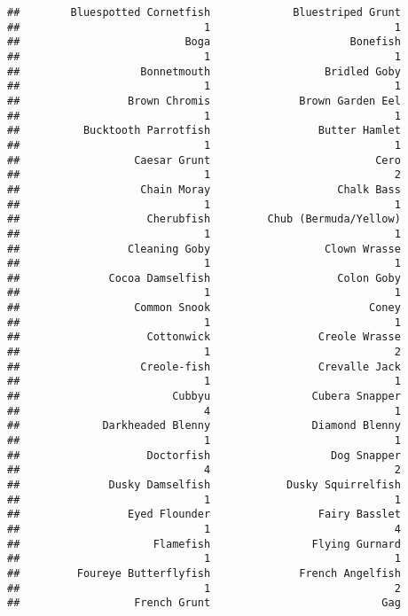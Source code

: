 \documentclass[
]{article}
\begin{document}
\begin{verbatim}
##        Bluespotted Cornetfish             Bluestriped Grunt 
##                             1                             1 
##                          Boga                      Bonefish 
##                             1                             1 
##                   Bonnetmouth                  Bridled Goby 
##                             1                             1 
##                 Brown Chromis              Brown Garden Eel 
##                             1                             1 
##          Bucktooth Parrotfish                 Butter Hamlet 
##                             1                             1 
##                  Caesar Grunt                          Cero 
##                             1                             2 
##                   Chain Moray                    Chalk Bass 
##                             1                             1 
##                    Cherubfish         Chub (Bermuda/Yellow) 
##                             1                             1 
##                 Cleaning Goby                  Clown Wrasse 
##                             1                             1 
##              Cocoa Damselfish                    Colon Goby 
##                             1                             1 
##                  Common Snook                         Coney 
##                             1                             1 
##                    Cottonwick                 Creole Wrasse 
##                             1                             2 
##                   Creole-fish                 Crevalle Jack 
##                             1                             1 
##                        Cubbyu                Cubera Snapper 
##                             4                             1 
##             Darkheaded Blenny                Diamond Blenny 
##                             1                             1 
##                    Doctorfish                   Dog Snapper 
##                             4                             2 
##              Dusky Damselfish            Dusky Squirrelfish 
##                             1                             1 
##                 Eyed Flounder                 Fairy Basslet 
##                             1                             4 
##                     Flamefish                Flying Gurnard 
##                             1                             1 
##         Foureye Butterflyfish              French Angelfish 
##                             1                             2 
##                  French Grunt                           Gag 

\end{verbatim}
\end{document}
